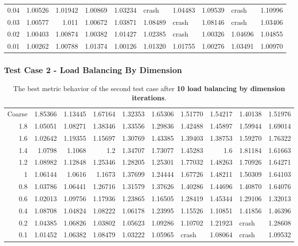 \documentclass[compress]{beamer}
\begin{document}
\begin{frame}[t]
\begin{table}[H]
\begin{tabular}{rrrrllllll}
  0.04 & 1.00526 & 1.01942 & 1.00869 & 1.03234 & crash   & 1.04483 & 1.09539 & crash   & 1.10996 \\
  0.03 & 1.00577 & 1.011   & 1.00672 & 1.03871 & 1.08489 & crash   & 1.08146 & crash   & 1.03406 \\
  0.02 & 1.00403 & 1.00874 & 1.00382 & 1.01427 & 1.02385 & crash   & 1.00326 & 1.04696 & 1.04855 \\
  0.01 & 1.00262 & 1.00788 & 1.01374 & 1.00126 & 1.01320 & 1.01755 & 1.00276 & 1.03491 & 1.00970 \\
\hline
\end{tabular}
\end{table}
\end{frame}

\begin{frame}[t]\frametitle{Test Case 2 - Load Balancing By Dimension}
\begin{table}[H]
\tiny
\centering
\caption{The best metric behavior of the second test case after \textbf{10 load balancing by dimension iterations}.} 
\begin{tabular}{rrrrrllrlr}
\hline
 Coarse    & 1.85366 & 1.13445 & 1.67164 & 1.32353 & 1.65306 & 1.51770 & 1.54217 & 1.40138 & 1.51976 \\
  1.8  & 1.05051 & 1.08271 & 1.38346 & 1.33556 & 1.29836 & 1.42488 & 1.45897 & 1.59944 & 1.69014 \\
  1.6  & 1.02642 & 1.19355 & 1.15697 & 1.30769 & 1.43385 & 1.39403 & 1.38753 & 1.59270 & 1.76322 \\
  1.4  & 1.0798  & 1.1068  & 1.2     & 1.34707 & 1.73077 & 1.45283 & 1.6     & 1.81184 & 1.61663 \\
  1.2  & 1.08982 & 1.12848 & 1.25346 & 1.28205 & 1.25301 & 1.77032 & 1.48263 & 1.70926 & 1.64271 \\
  1    & 1.06144 & 1.0616  & 1.1673  & 1.37699 & 1.24444 & 1.67726 & 1.48211 & 1.50309 & 1.64103 \\
  0.8  & 1.03786 & 1.06441 & 1.26716 & 1.31579 & 1.37626 & 1.40286 & 1.44696 & 1.40870 & 1.64076 \\
  0.6  & 1.02013 & 1.09756 & 1.17936 & 1.23865 & 1.16505 & 1.28419 & 1.45344 & 1.29106 & 1.32013 \\
  0.4  & 1.08708 & 1.04824 & 1.08222 & 1.06178 & 1.23995 & 1.15526 & 1.10851 & 1.41856 & 1.46396 \\
  0.2  & 1.04385 & 1.06826 & 1.03802 & 1.05623 & 1.09286 & 1.10702 & 1.21923 & crash   & 1.28608 \\
  0.1  & 1.01452 & 1.06382 & 1.08479 & 1.03222 & 1.05965 & crash   & 1.08064 & crash   & 1.09532 \\

\end{tabular}
\end{table}
\end{frame}
\end{document}
